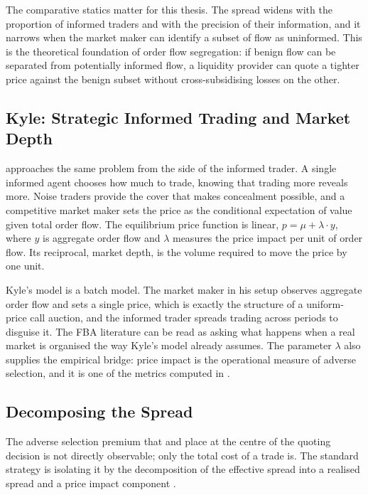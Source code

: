 The comparative statics matter for this thesis. The spread widens with
the proportion of informed traders and with the precision of their
information, and it narrows when the market maker can identify a subset
of flow as uninformed. This is the theoretical foundation of order flow
segregation: if benign flow can be separated from potentially informed
flow, a liquidity provider can quote a tighter price against the benign
subset without cross-subsidising losses on the other.

\subsection{Kyle: Strategic Informed Trading and Market Depth}

\citet{kyle1985continuous} approaches the same problem from the side of
the informed trader. A single informed agent chooses how much to trade,
knowing that trading more reveals more. Noise traders provide the cover
that makes concealment possible, and a competitive market maker sets the
price as the conditional expectation of value given total order flow.
The equilibrium price function is linear, $p = \mu + \lambda \cdot y$,
where $y$ is aggregate order flow and $\lambda$ measures the price
impact per unit of order flow. Its reciprocal, market depth, is the
volume required to move the price by one unit.

Kyle's model is a batch model. The market maker in his setup observes
aggregate order flow and sets a single price, which is exactly the
structure of a uniform-price call auction, and the informed trader
spreads trading across periods to disguise it. The FBA literature can be
read as asking what happens when a real market is organised the way
Kyle's model already assumes. The parameter $\lambda$ also supplies the
empirical bridge: price impact is the operational measure of adverse
selection, and it is one of the metrics computed in
.

\subsection{Decomposing the Spread}
\label{sec:spread-decomposition}

The adverse selection premium that \citet{kyle1985continuous} and
\citet{glosten1985bid} place at the centre of the quoting decision is
not directly observable; only the total cost of a trade is. The standard strategy
is isolating it by the decomposition of the effective
spread into a realised spread and a price impact component
\citep{hasbrouck1993assessing,hendershott2011algorithmic}.

